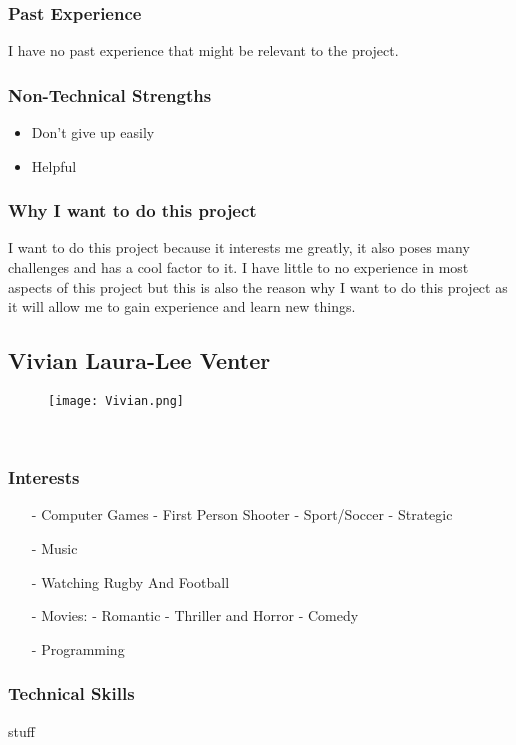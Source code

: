 \subsubsection{Past Experience}
I have no past experience that might be relevant to the project. %
\subsubsection{Non-Technical Strengths}
	\begin{itemize}
		\item Don't give up easily
		\item Helpful
	\end{itemize}
\subsubsection{Why I want to do this project} 
I want to do this project because it interests me greatly, it also poses many challenges and has a cool factor to it. I have little to no experience in most aspects of this project but this is also the reason why I want to do this project as it will allow me to gain experience and learn new things. 


\subsection{Vivian Laura-Lee Venter}
\begin{wrapfigure}[7]{l}{0.25\textwidth}
\vspace{10pt}
\texttt{[image: Vivian.png]}
\end{wrapfigure}

\textcolor{white}{.}
\subsubsection{Interests}
\begin{itemize}
	\item[-]{Computer Games}
		\subitem- First Person Shooter
		\subitem- Sport/Soccer
		\subitem- Strategic
	\item[-]{Music}
	\item[-]{Watching Rugby And Football}
	\item[-]{Movies:}
		\subitem- Romantic
		\subitem- Thriller and Horror
		\subitem- Comedy
	\item[-]{Programming}
\end{itemize}
\subsubsection{Technical Skills} stuff

